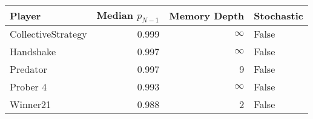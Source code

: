 \begin{tabular}{lrrl}
\toprule
             Player &  Median $p_{N-1}$ &  Memory Depth & Stochastic \\
\midrule
 CollectiveStrategy &             0.999 &            \(\infty\) &      False \\
          Handshake &             0.997 &            \(\infty\) &      False \\
           Predator &             0.997 &             9 &      False \\
           Prober 4 &             0.993 &            \(\infty\) &      False \\
           Winner21 &             0.988 &             2 &      False \\
\bottomrule
\end{tabular}
